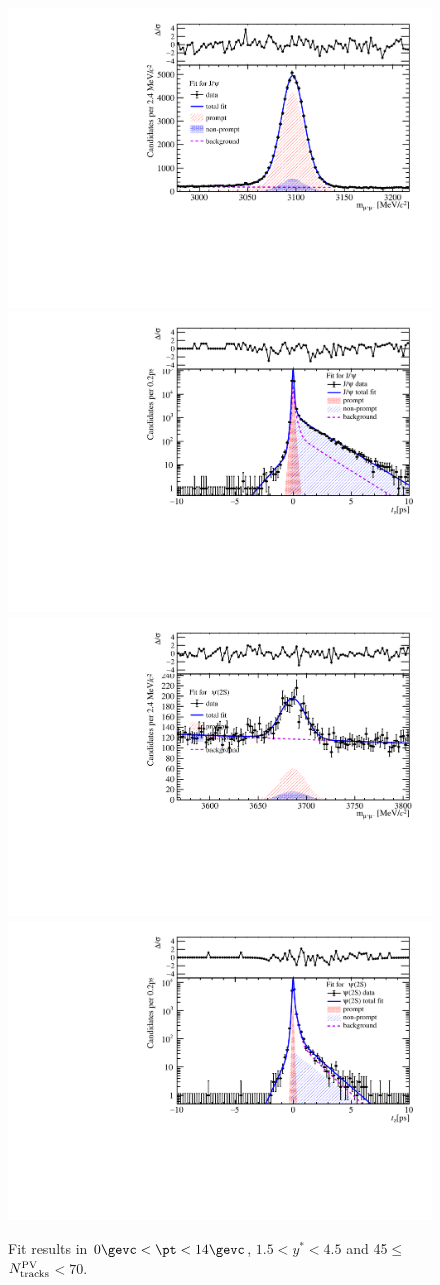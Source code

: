 \begin{figure}[H]
\begin{center}
\includegraphics[width=0.45\linewidth]{pdf/Pbp/Workdir/TwoDimFit/ProjMass/Jpsi_n2y1pt1.pdf}
\includegraphics[width=0.45\linewidth]{pdf/Pbp/Workdir/TwoDimFit/ProjTz/Jpsi_n2y1pt1.pdf}
\vspace*{-0.5cm}
\includegraphics[width=0.45\linewidth]{pdf/Pbp/Workdir/TwoDimFit/ProjMass/Psi2S_n2y1pt1.pdf}
\includegraphics[width=0.45\linewidth]{pdf/Pbp/Workdir/TwoDimFit/ProjTz/Psi2S_n2y1pt1.pdf}
\vspace*{-0.5cm}
\end{center}
\caption{Fit results in $0\gevc<\pt<14\gevc$, $1.5<y^*<4.5$ and 45$\leq$$N_{\rm tracks}^{\rm PV}$$<70$.}
\end{figure}
